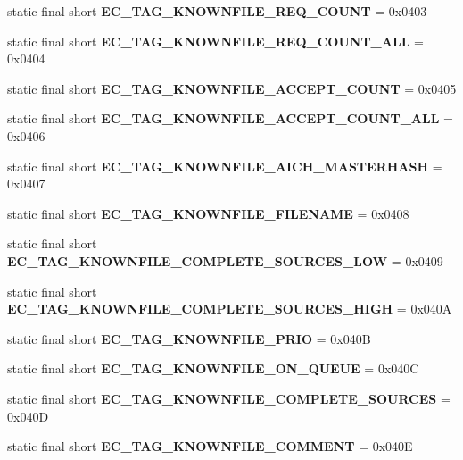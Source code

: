 \begin{DoxyCompactItemize}
\item 
static final short {\bfseries EC\_\-TAG\_\-KNOWNFILE\_\-REQ\_\-COUNT} = 0x0403\label{interfaceECCodes_a4236b61c4fc5784c852847c663451e31}

\item 
static final short {\bfseries EC\_\-TAG\_\-KNOWNFILE\_\-REQ\_\-COUNT\_\-ALL} = 0x0404\label{interfaceECCodes_a1f80ceb9cd71a9e2772732c3c047a5b8}

\item 
static final short {\bfseries EC\_\-TAG\_\-KNOWNFILE\_\-ACCEPT\_\-COUNT} = 0x0405\label{interfaceECCodes_ab4f42afcf34bf61718957250a3d6aefb}

\item 
static final short {\bfseries EC\_\-TAG\_\-KNOWNFILE\_\-ACCEPT\_\-COUNT\_\-ALL} = 0x0406\label{interfaceECCodes_a4e9a98b124e97f24320cf2bcf0dfd7dd}

\item 
static final short {\bfseries EC\_\-TAG\_\-KNOWNFILE\_\-AICH\_\-MASTERHASH} = 0x0407\label{interfaceECCodes_a4e9f37fef9cdf4cf176ac3a3bcb7ec35}

\item 
static final short {\bfseries EC\_\-TAG\_\-KNOWNFILE\_\-FILENAME} = 0x0408\label{interfaceECCodes_aa5e849340d0545fbe6155ba849eea828}

\item 
static final short {\bfseries EC\_\-TAG\_\-KNOWNFILE\_\-COMPLETE\_\-SOURCES\_\-LOW} = 0x0409\label{interfaceECCodes_af7051956cf069fe80858ba71d775e90a}

\item 
static final short {\bfseries EC\_\-TAG\_\-KNOWNFILE\_\-COMPLETE\_\-SOURCES\_\-HIGH} = 0x040A\label{interfaceECCodes_ae99996e3604202eafb71a8e943fa557a}

\item 
static final short {\bfseries EC\_\-TAG\_\-KNOWNFILE\_\-PRIO} = 0x040B\label{interfaceECCodes_a4311e67889200b162b51e48ff4982a3d}

\item 
static final short {\bfseries EC\_\-TAG\_\-KNOWNFILE\_\-ON\_\-QUEUE} = 0x040C\label{interfaceECCodes_a328add322492df2036f480af5e5af865}

\item 
static final short {\bfseries EC\_\-TAG\_\-KNOWNFILE\_\-COMPLETE\_\-SOURCES} = 0x040D\label{interfaceECCodes_aa889c7282f3f41be7ee9f7eb14852fe9}

\item 
static final short {\bfseries EC\_\-TAG\_\-KNOWNFILE\_\-COMMENT} = 0x040E\label{interfaceECCodes_a1ceae74afbfd41e2b2ecbca927f4df62}


\end{DoxyCompactItemize}
